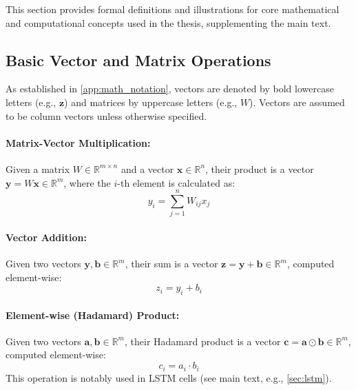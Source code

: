 \begin{appendices}
  This section provides formal definitions and illustrations for core mathematical and computational concepts used in the thesis, supplementing the main text.

  \subsection{Basic Vector and Matrix Operations}
  \label{subsec:basic_ops_app} %
  As established in \autoref{app:math_notation}, vectors are denoted by bold lowercase letters (e.g., \( \bm{z} \)) and matrices by uppercase letters (e.g., \( W \)). Vectors are assumed to be column vectors unless otherwise specified.

  \paragraph{Matrix-Vector Multiplication:}
  Given a matrix \( W \in \mathbb{R}^{m \times n} \) and a vector \( \bm{x} \in \mathbb{R}^n \), their product is a vector \( \bm{y} = W\bm{x} \in \mathbb{R}^m \), where the \( i \)-th element is calculated as:
  \begin{equation}
    y_i = \sum_{j=1}^{n} W_{ij} x_j %
  \end{equation}

  \paragraph{Vector Addition:}
  Given two vectors \( \bm{y}, \bm{b} \in \mathbb{R}^m \), their sum is a vector \( \bm{z} = \bm{y} + \bm{b} \in \mathbb{R}^m \), computed element-wise:
  \begin{equation}
    z_i = y_i + b_i %
  \end{equation}

  \paragraph{Element-wise (Hadamard) Product:}
  Given two vectors \( \bm{a}, \bm{b} \in \mathbb{R}^m \), their Hadamard product is a vector \( \bm{c} = \bm{a} \odot \bm{b} \in \mathbb{R}^m \), computed element-wise:
  \begin{equation}
    c_i = a_i \cdot b_i %
  \end{equation}
  This operation is notably used in LSTM cells (see main text, e.g., \autoref{sec:lstm}). %


\end{appendices}
